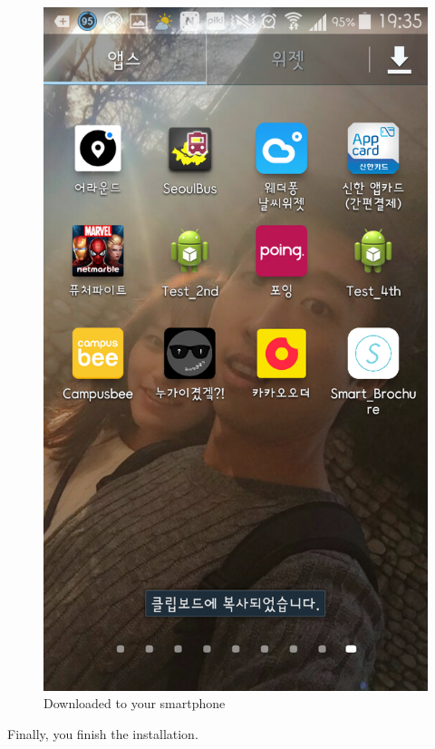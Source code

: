 \documentclass[conference]{IEEEtran}
\begin{document}
\begin{figure}[htbp]
\begin{center}
    \includegraphics[scale=0.18]{img_install03}
    \caption{Downloaded to your smartphone} 
\end{center}
\end{figure}

Finally, you finish the installation. \\\\\\
\end{document}
